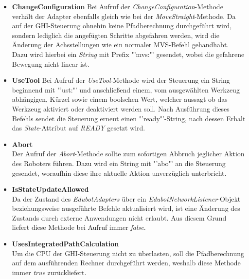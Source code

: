 \begin{itemize}
\item \textbf{ChangeConfiguration}
\newline
Bei Aufruf der \textit{ChangeConfiguration}-Methode verhält der Adapter ebenfalls gleich wie bei der \textit{MoveStraight}-Methode. Da auf der GHI-Steuerung ohnehin keine Pfadberechnung durchgeführt wird, sondern lediglich die angefügten Schritte abgefahren werden, wird die Änderung der Achsstellungen wie ein normaler MVS-Befehl gehandhabt.
Dazu wird hierbei ein \textit{String} mit Prefix "'mvs:"' gesendet, wobei die gefahrene Bewegung nicht linear ist.
\item \textbf{UseTool}
\newline
Bei Aufruf der \textit{UseTool}-Methode wird der Steuerung ein String beginnend mit "'ust:"' und anschließend einem, vom ausgewählten Werkzeug abhängigen, Kürzel sowie einem boolschen Wert, welcher aussagt ob das Werkzeug aktiviert oder deaktiviert werden soll. Nach Ausführung dieses Befehls sendet die Steuerung erneut einen "'ready"'-String, nach dessen Erhalt das \textit{State}-Attribut auf \textit{READY} gesetzt wird. 
\item \textbf{Abort}\\
Der Aufruf der \textit{Abort}-Methode sollte zum sofortigen Abbruch jeglicher Aktion des Roboters führen. Dazu wird ein String mit "'abo"' an die Steuerung gesendet, woraufhin diese ihre aktuelle Aktion unverzüglich unterbricht.
\item \textbf{IsStateUpdateAllowed}\\
Da der Zustand des \textit{EdubotAdapters} über ein \textit{EdubotNetworkListener}-Objekt beziehungsweise ausgeführte Befehle aktualisiert wird, ist eine Änderung des Zustands durch externe Anwendungen nicht erlaubt. Aus diesem Grund liefert diese Methode bei Aufruf immer \textit{false}.
\item \textbf{UsesIntegratedPathCalculation}\\
Um die CPU der GHI-Steuerung nicht zu überlasten, soll die Pfadberechnung auf dem ausführenden Rechner durchgeführt werden, weshalb diese Methode immer \textit{true} zurückliefert.
\end{itemize}

